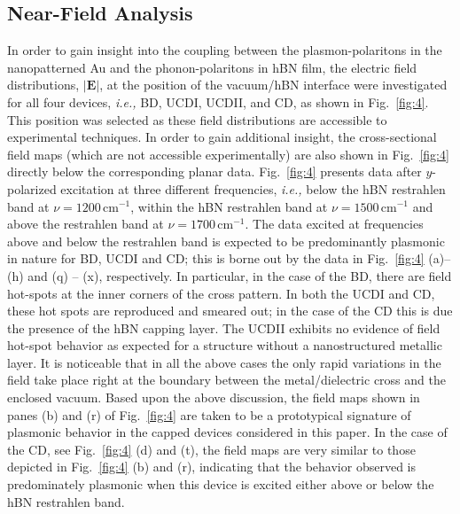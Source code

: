 \documentclass[reprint,
amsmath,amssymb,
aip,
jap,
floatfix,]{revtex4-2}
\begin{document}
			\subsection{Near-Field Analysis}
			\label{sec:NFA}
				In order to gain insight into the coupling between the plasmon-polaritons in the nanopatterned Au and the phonon-polaritons in hBN film, the electric field distributions, $|\bm{E}|$, at the position of the vacuum/hBN interface were investigated for all four devices,  \textit{i.e.,} BD, UCDI, UCDII, and CD, as shown in Fig.~\ref{fig:4}. This position was selected as these field distributions are accessible to experimental techniques. In order to gain additional insight, the cross-sectional field maps (which are not accessible experimentally) are also shown in Fig.~\ref{fig:4} directly below the corresponding planar data. Fig.~\ref{fig:4} presents data after $y$-polarized excitation at three different frequencies, \textit{i.e.,} below the hBN restrahlen band at $\nu = 1200 \, \mathrm{cm}^{-1}$, within the hBN restrahlen band at $\nu = 1500 \, \mathrm{cm}^{-1}$ and above the restrahlen band at $\nu = 1700 \, \mathrm{cm}^{-1}$. The data excited at frequencies above and below the restrahlen band is expected to be predominantly plasmonic in nature for   BD, UCDI and CD; this is borne out by the data in Fig.~\ref{fig:4} (a)--(h) and (q) -- (x), respectively. In particular, in the case of the BD, there are field hot-spots at the inner corners of the cross pattern. In both the UCDI and CD, these hot spots are reproduced and smeared out; in the case of the CD this is due the presence of the  hBN capping layer. The UCDII exhibits no evidence of field hot-spot behavior as expected for a structure without a nanostructured metallic layer. It is noticeable that in all the above cases the only rapid variations in the field take place right at the boundary between the metal/dielectric cross and the enclosed vacuum. Based upon the above discussion, the field maps shown in panes (b) and (r) of Fig.~\ref{fig:4} are taken to be a prototypical signature of plasmonic behavior in the capped devices considered in this paper. In the case of the CD, see Fig.~\ref{fig:4} (d) and (t), the field maps are very similar to those depicted in Fig.~\ref{fig:4} (b) and (r), indicating that the behavior observed is predominately plasmonic when this device is excited either above or below the hBN restrahlen band.
\end{document}
